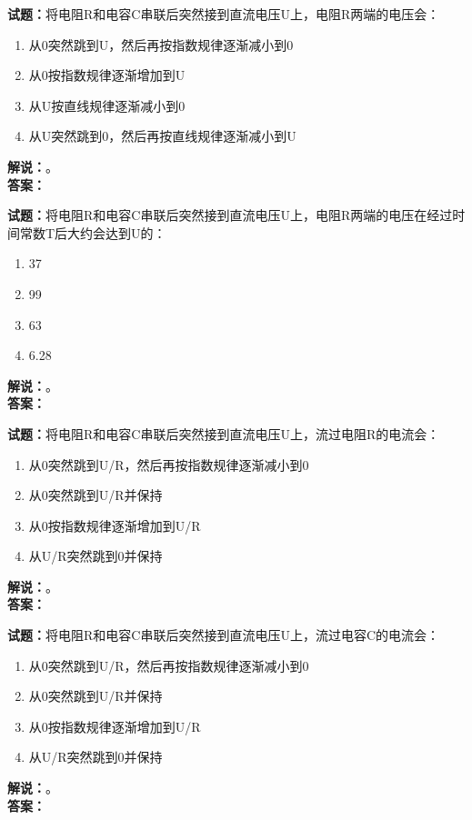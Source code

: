 \documentclass{ctexbook}
\begin{document}
\bigskip




\noindent\textbf{试题：}将电阻R和电容C串联后突然接到直流电压U上，电阻R两端的电压会：
\begin{enumerate}[leftmargin=3em]
\item 从0突然跳到U，然后再按指数规律逐渐减小到0
\item 从0按指数规律逐渐增加到U
\item 从U按直线规律逐渐减小到0
\item 从U突然跳到0，然后再按直线规律逐渐减小到U
\end{enumerate}
\noindent\textbf{解说：}\textbf{}。\\\noindent\textbf{答案：}

\bigskip




\noindent\textbf{试题：}将电阻R和电容C串联后突然接到直流电压U上，电阻R两端的电压在经过时间常数T后大约会达到U的：
\begin{enumerate}[leftmargin=3em]
\item 37%
\item 99%
\item 63%
\item 6.28%
\end{enumerate}
\noindent\textbf{解说：}\textbf{}。\\\noindent\textbf{答案：}

\bigskip




\noindent\textbf{试题：}将电阻R和电容C串联后突然接到直流电压U上，流过电阻R的电流会：
\begin{enumerate}[leftmargin=3em]
\item 从0突然跳到U/R，然后再按指数规律逐渐减小到0
\item 从0突然跳到U/R并保持
\item 从0按指数规律逐渐增加到U/R
\item 从U/R突然跳到0并保持
\end{enumerate}
\noindent\textbf{解说：}\textbf{}。\\\noindent\textbf{答案：}

\bigskip




\noindent\textbf{试题：}将电阻R和电容C串联后突然接到直流电压U上，流过电容C的电流会：
\begin{enumerate}[leftmargin=3em]
\item 从0突然跳到U/R，然后再按指数规律逐渐减小到0
\item 从0突然跳到U/R并保持
\item 从0按指数规律逐渐增加到U/R
\item 从U/R突然跳到0并保持
\end{enumerate}
\noindent\textbf{解说：}\textbf{}。\\\noindent\textbf{答案：}
\end{document}
